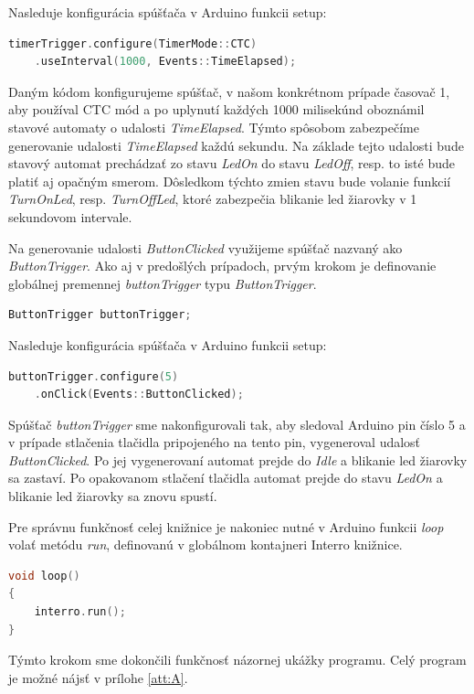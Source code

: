 Nasleduje konfigurácia spúšťača v Arduino funkcii setup:
\begin{lstlisting}[language=c++]  
timerTrigger.configure(TimerMode::CTC)
    .useInterval(1000, Events::TimeElapsed); 
\end{lstlisting}

Daným kódom konfigurujeme spúšťač, v našom konkrétnom prípade časovač 1, aby používal CTC mód a po uplynutí každých 1000 milisekúnd oboznámil stavové automaty
o udalosti \textit{TimeElapsed}. Týmto spôsobom zabezpečíme generovanie udalosti \textit{TimeElapsed} každú sekundu. Na základe tejto udalosti bude stavový automat
prechádzať zo stavu \textit{LedOn} do stavu \textit{LedOff}, resp. to isté bude platiť aj opačným smerom. Dôsledkom týchto zmien stavu bude volanie funkcií
\textit{TurnOnLed}, resp. \textit{TurnOffLed}, ktoré zabezpečia blikanie led žiarovky v 1 sekundovom intervale.  \par

Na generovanie udalosti \textit{ButtonClicked} využijeme spúšťač nazvaný ako \textit{ButtonTrigger}. Ako aj v predošlých prípadoch, prvým krokom je definovanie globálnej premennej
\textit{buttonTrigger} typu \textit{ButtonTrigger}.

\begin{lstlisting}[language=c++]  
ButtonTrigger buttonTrigger;            
\end{lstlisting}

Nasleduje konfigurácia spúšťača v Arduino funkcii setup:
\begin{lstlisting}[language=c++]  
buttonTrigger.configure(5)
    .onClick(Events::ButtonClicked); 
\end{lstlisting}

Spúšťač \textit{buttonTrigger} sme nakonfigurovali tak, aby sledoval Arduino pin číslo 5 a v prípade stlačenia tlačidla pripojeného na tento pin, vygeneroval udalosť
\textit{ButtonClicked}. Po jej vygenerovaní automat prejde do  \textit{Idle} a blikanie led žiarovky sa zastaví. Po opakovanom stlačení tlačidla automat prejde do
stavu \textit{LedOn} a blikanie led žiarovky sa znovu spustí. \par
Pre správnu funkčnosť celej knižnice je nakoniec nutné v Arduino funkcii \textit{loop} volať metódu \textit{run}, definovanú v globálnom kontajneri Interro knižnice.
\begin{lstlisting}[language=c++]  
void loop()
{
    interro.run();
}
\end{lstlisting}

Týmto krokom sme dokončili funkčnosť názornej ukážky programu. Celý program je možné nájsť v prílohe \ref{att:A}.

